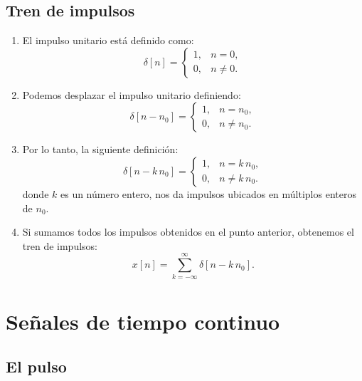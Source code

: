 \documentclass[11pt,a4paper,openany]{book}
\begin{document}
\subsection{Tren de impulsos}

\begin{enumerate}
	\item El impulso unitario está definido como:
	\begin{equation}
		\delta[n] = 
		\begin{cases}
			1, & n = 0, \\
			0, & n \neq 0.
		\end{cases}
	\end{equation}
	
	\item Podemos desplazar el impulso unitario definiendo:
	\begin{equation}
		\delta[n - n_{0}] = 
		\begin{cases}
			1, & n = n_{0}, \\
			0, & n \neq n_{0}.
		\end{cases}
	\end{equation}
	
	\item Por lo tanto, la siguiente definición:
	\begin{equation}
		\delta[n - k \, n_{0}] = 
		\begin{cases}
			1, & n = k \, n_{0}, \\
			0, & n \neq k \, n_{0}.
		\end{cases}
	\end{equation}
	donde $k$ es un número entero, nos da impulsos ubicados en múltiplos enteros de $n_{0}$.
	
	\item Si sumamos todos los impulsos obtenidos en el punto anterior,
	obtenemos el tren de impulsos:
	\begin{equation}
		x[n] = \sum_{k=-\infty}^{\infty} \delta[n - k \, n_{0}].
	\end{equation}
	
\end{enumerate}


\section{Señales de tiempo continuo}

\subsection{El pulso}
\end{document}
